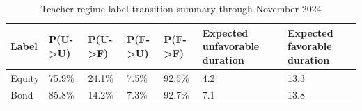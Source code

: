 \begin{table}[!htbp]
\centering
\caption{Teacher regime label transition summary through November 2024}
\small
\begin{tabular}{lllllll}
\toprule
Label & P(U->U) & P(U->F) & P(F->U) & P(F->F) & Expected unfavorable duration & Expected favorable duration \\
\midrule
Equity & 75.9\% & 24.1\% & 7.5\% & 92.5\% & 4.2 & 13.3 \\
Bond & 85.8\% & 14.2\% & 7.3\% & 92.7\% & 7.1 & 13.8 \\
\bottomrule
\end{tabular}
\end{table}